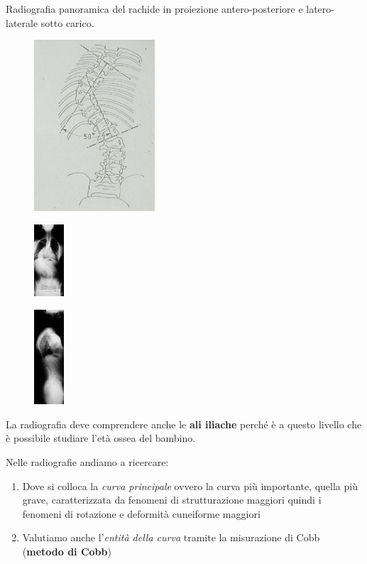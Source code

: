 Radiografia panoramica del rachide in proiezione antero-posteriore e
latero-laterale sotto carico.
\begin{figure}[!ht]
\centering
	\includegraphics[width=0.4\textwidth]{012/image27.jpeg}
\end{figure}
\begin{figure}[!ht]
\centering
	\includegraphics[width=0.1\textwidth]{012/image28.png}
\end{figure}
\begin{figure}[!ht]
\centering
	\includegraphics[width=0.1\textwidth]{012/image29.png}
\end{figure}

La radiografia deve comprendere anche le \textbf{ali iliache} perché è a
questo livello che è possibile studiare l'età ossea del bambino.

Nelle radiografie andiamo a ricercare:

\begin{enumerate}
\def\labelenumi{\arabic{enumi}.}
\item
  Dove si colloca la \emph{curva principale} ovvero la curva più
  importante, quella più grave, caratterizzata da fenomeni di
  strutturazione maggiori quindi i fenomeni di rotazione e deformità
  cuneiforme maggiori
\item 
  Valutiamo anche l'\emph{entità della curva} tramite la misurazione di
  Cobb (\textbf{metodo di Cobb})
\end{enumerate}

